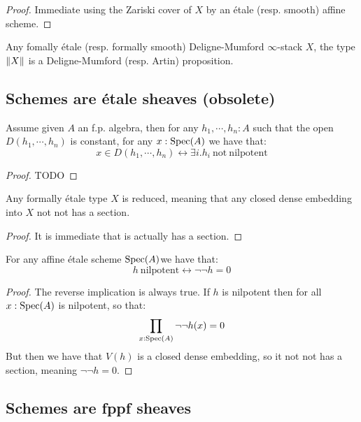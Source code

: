 \begin{proof}
Immediate using the Zariski cover of $X$ by an étale (resp. smooth) affine scheme.
\end{proof}

\begin{lemma}
Any fomally étale (resp. formally smooth) Deligne-Mumford $\infty$-stack $X$, the type $\lVert X \rVert$ is a Deligne-Mumford (resp. Artin) proposition.
\end{lemma}

\subsection{Schemes are étale sheaves (obsolete)}

\begin{lemma}\label{constant-open-affine}
Assume given $A$ an f.p. algebra, then for any $h_1,\cdots,h_n:A$ such that the open $D(h_1,\cdots,h_n)$ is constant, for any $x:\operatorname{Spec}(A)$ we have that:
\[x\in D(h_1,\cdots,h_n) \leftrightarrow \exists i. h_i\ \mathrm{not\ nilpotent}\]
\end{lemma}

\begin{proof}
TODO
\end{proof}

\begin{lemma}
Any formally étale type $X$ is reduced, meaning that any closed dense embedding into $X$ not not has a section.
\end{lemma}

\begin{proof}
It is immediate that is actually has a section.
\end{proof}

\begin{corollary}\label{etale-affine-reduced}
For any affine étale scheme $\operatorname{Spec}(A)$we have that:
\[h\ \mathrm{nilpotent} \leftrightarrow \neg\neg h=0\]
\end{corollary}

\begin{proof}
The reverse implication is always true. If $h$ is nilpotent then for all $x:\operatorname{Spec}(A)$ is nilpotent, so that:
\[\prod_{x:\operatorname{Spec}(A)} \neg\neg h(x)=0\]
But then we have that $V(h)$ is a closed dense embedding, so it not not has a section, meaning $\neg\neg h = 0$.
\end{proof}

\subsection{Schemes are fppf sheaves}

